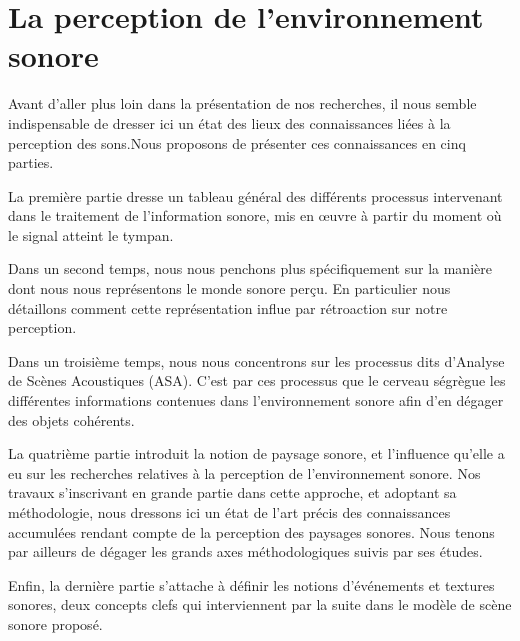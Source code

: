 \chapter{La perception de l'environnement sonore}\label{ch:psycho_ea}

Avant d'aller plus loin dans la présentation de nos recherches, il nous semble indispensable de dresser ici un état des lieux des connaissances liées à la perception des sons.Nous proposons de présenter ces connaissances en cinq parties. 

La première partie dresse un tableau général des différents processus intervenant dans le traitement de l'information sonore, mis en œuvre à partir du moment où le signal atteint le tympan. 

Dans un second temps, nous nous penchons plus spécifiquement sur la manière dont nous nous représentons le monde sonore perçu. En particulier nous détaillons comment cette représentation influe par rétroaction sur notre perception. 

Dans un troisième temps, nous nous concentrons sur les processus dits d'Analyse de Scènes Acoustiques (ASA). C'est par ces processus que le cerveau ségrègue les différentes informations contenues dans l'environnement sonore afin d'en dégager des objets cohérents. 

La quatrième partie introduit la notion de paysage sonore, et l'influence qu'elle a eu sur les recherches relatives à la perception de l'environnement sonore. Nos travaux s'inscrivant en grande partie dans cette approche, et adoptant sa méthodologie, nous dressons ici un état de l'art précis des connaissances accumulées rendant compte de la perception des paysages sonores. Nous tenons par ailleurs de dégager les grands axes méthodologiques suivis par ses études.

Enfin, la dernière partie s'attache à définir les notions d'événements et textures sonores, deux concepts clefs qui interviennent par la suite dans le modèle de scène sonore proposé.

